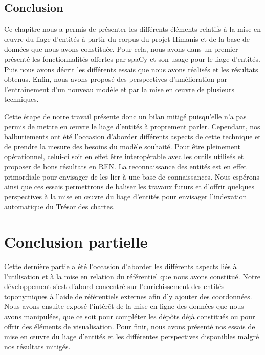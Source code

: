 \documentclass[a4paper,12pt,twoside]{book}
\begin{document}
	\section*{Conclusion}
	
	Ce chapitre nous a permis de présenter les différents éléments relatifs à la mise en œuvre du liage d'entités à partir du corpus du projet Himanis et de la base de données que nous avons constituée. Pour cela, nous avons dans un premier présenté les fonctionnalités offertes par spaCy et son usage pour le liage d'entités. Puis nous avons décrit les différents essais que nous avons réalisés et les résultats obtenus. Enfin, nous avons proposé des perspectives d'amélioration par l'entraînement d'un nouveau modèle et par la mise en œuvre de plusieurs techniques.
	
	Cette étape de notre travail présente donc un bilan mitigé puisqu'elle n'a pas permis de mettre en œuvre le liage d'entités à proprement parler. Cependant, nos balbutiements ont été l'occasion d'aborder différents aspects de cette technique et de prendre la mesure des besoins du modèle souhaité. Pour être pleinement opérationnel, celui-ci soit en effet être interopérable avec les outils utilisés et proposer de bons résultats en REN. La reconnaissance des entités est en effet primordiale pour envisager de les lier à une base de connaissances. Nous espérons ainsi que ces essais permettrons de baliser les travaux futurs et d'offrir quelques perspectives à la mise en œuvre du liage d'entités pour envisager l'indexation automatique du Trésor des chartes.
	
	\chapter*{Conclusion partielle}
	
	
	Cette dernière partie a été l'occasion d'aborder les différents aspects liés à l'utilisation et à la mise en relation du référentiel que nous avons constitué. Notre développement s'est d'abord concentré sur l'enrichissement des entités toponymiques à l'aide de référentiels externes afin d'y ajouter des coordonnées. Nous avons ensuite exposé l'intérêt de la mise en ligne des données que nous avons manipulées, que ce soit pour compléter les dépôts déjà constitués ou pour offrir des éléments de visualisation. Pour finir, nous avons présenté nos essais de mise en œuvre du liage d'entités et les différentes perspectives disponibles malgré nos résultats mitigés.
	
\end{document}
